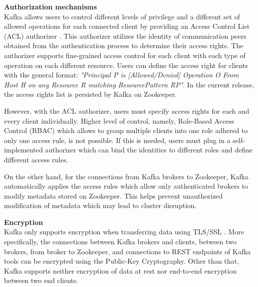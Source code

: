 \textbf{Authorization mechanisms}\\
Kafka allows users to control different levels of privilege and a different set of allowed operations for each connected client by providing an Access Control List (ACL) authorizer \cite{kafkasecurity}. This authorizer utilizes the identity of communication peers obtained from the authentication process to determine their access rights. The authorizer supports fine-grained access control for each client with each type of operation on each different resource. Users can define the access right for clients with the general format: \emph{"Principal P is [Allowed/Denied] Operation O From Host H on any Resource R matching ResourcePattern RP"}. In the current release, the access rights list is persisted by Kafka on Zookeeper. 

However, with the ACL authorizer, users must specify access rights for each and every client individually. Higher level of control, namely, Role-Based Access Control (RBAC) which allows to group multiple clients into one role adhered to only one access rule, is not possible. If this is needed, users must plug in a self-implemented authorizer which can bind the identities to different roles and define different access rules. 

On the other hand, for the connections from Kafka brokers to Zookeeper, Kafka automatically applies the access rules which allow only authenticated brokers to modify metadata stored on Zookeeper. This helps prevent unauthorized modification of metadata which may lead to cluster disruption.

\textbf{Encryption}\\
Kafka only supports encryption when transferring data using TLS/SSL \cite{kafkasecurity}. More specifically, the connections between Kafka brokers and clients, between two brokers, from broker to Zookeeper, and connections to REST endpoints of Kafka tools can be encrypted using the Public-Key Cryptography. Other than that, Kafka supports neither encryption of data at rest nor end-to-end encryption between two end clients.  

